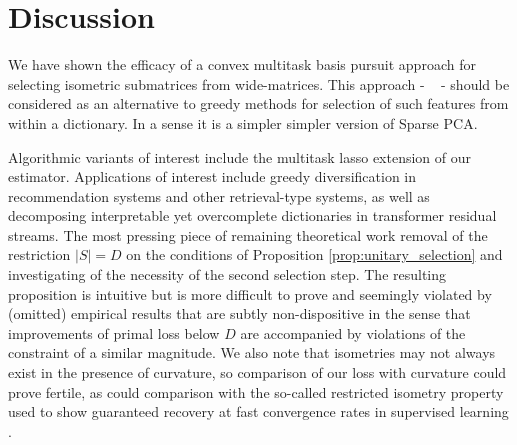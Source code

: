 \section{Discussion}
\label{sec:discussion}

We have shown the efficacy of a convex multitask basis pursuit approach for selecting isometric submatrices from wide-matrices.
This approach - \isometrypursuit~ - should be considered as an alternative to greedy methods for selection of such features from within a dictionary.
In a sense it is a simpler simpler version of Sparse PCA.

Algorithmic variants of interest include the multitask lasso extension of our estimator.
Applications of interest include greedy diversification in recommendation systems \cite{Carbonell2017-gi, Wu2019-uk} and other retrieval-type systems, as well as decomposing interpretable yet overcomplete dictionaries in transformer residual streams.
The most pressing piece of remaining theoretical work removal of the restriction $|S| = D$ on the conditions of Proposition \ref{prop:unitary_selection} and investigating of the necessity of the second selection step.
The resulting proposition is intuitive but is more difficult to prove and seemingly violated by (omitted) empirical results that are subtly non-dispositive in the sense that improvements of primal loss below $D$ are accompanied by violations of the constraint of a similar magnitude.
We also note that isometries may not always exist in the presence of curvature, so comparison of our loss with curvature could prove fertile, as could comparison with the so-called restricted isometry property used to show guaranteed recovery at fast convergence rates in supervised learning \cite{Candes2005-dd, Hastie2015-qa}.

